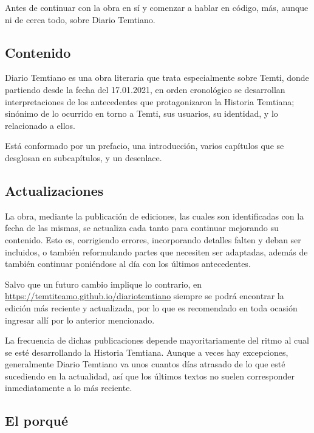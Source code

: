 \documentclass[
  spanish,
]{book}
\begin{document}
Antes de continuar con la obra en sí y comenzar a hablar en código, más, aunque ni de cerca todo, sobre Diario Temtiano.

\hypertarget{contenido}{%
\subsection*{Contenido}\label{contenido}}

Diario Temtiano es una obra literaria que trata especialmente sobre Temti, donde partiendo desde la fecha del 17.01.2021, en orden cronológico se desarrollan interpretaciones de los antecedentes que protagonizaron la Historia Temtiana; sinónimo de lo ocurrido en torno a Temti, sus usuarios, su identidad, y lo relacionado a ellos.

Está conformado por un prefacio, una introducción, varios capítulos que se desglosan en subcapítulos, y un desenlace.

\hypertarget{actualizaciones}{%
\subsection*{Actualizaciones}\label{actualizaciones}}

La obra, mediante la publicación de ediciones, las cuales son identificadas con la fecha de las mismas, se actualiza cada tanto para continuar mejorando su contenido. Esto es, corrigiendo errores, incorporando detalles falten y deban ser incluidos, o también reformulando partes que necesiten ser adaptadas, además de también continuar poniéndose al día con los últimos antecedentes.

Salvo que un futuro cambio implique lo contrario, en \url{https://temtiteamo.github.io/diariotemtiano} siempre se podrá encontrar la edición más reciente y actualizada, por lo que es recomendado en toda ocasión ingresar allí por lo anterior mencionado.

La frecuencia de dichas publicaciones depende mayoritariamente del ritmo al cual se esté desarrollando la Historia Temtiana. Aunque a veces hay excepciones, generalmente Diario Temtiano va unos cuantos días atrasado de lo que esté sucediendo en la actualidad, así que los últimos textos no suelen corresponder inmediatamente a lo más reciente.

\hypertarget{el-porquuxe9}{%
\subsection*{El porqué}\label{el-porquuxe9}}
\end{document}
